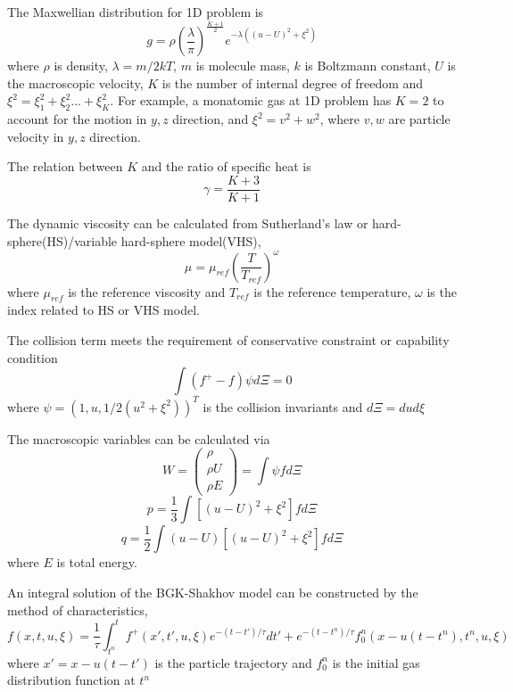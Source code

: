 \documentclass[a4paper]{book}
\begin{document}
The Maxwellian distribution for 1D problem is
\begin{equation}
    \label{eq:maxwell_1D}
    g = \rho\left(\frac{\lambda}{\pi}\right)^{\frac{K+1}{2}}e^{-\lambda((u-U)^2+\xi^2)}
\end{equation}
where $\rho$ is density, $\lambda=m/2kT$, $m$ is molecule mass, $k$ is Boltzmann constant, $U$ is the macroscopic velocity, $K$ is the number of internal degree of freedom and $\xi^2=\xi_1^2+\xi_2^2...+\xi_K^2$. For example, a monatomic gas at 1D problem has $K=2$ to account for the motion in $y,z$ direction, and $\xi^2=v^2+w^2$, where $v,w$ are particle velocity in $y,z$ direction. 

The relation between $K$ and the ratio of specific heat is
\begin{equation} 
    \gamma = \frac{K+3}{K+1}
\end{equation}

The dynamic viscosity can be calculated from Sutherland's law or hard-sphere(HS)/variable hard-sphere model(VHS),
\begin{equation} 
    \label{eq:viscosity}
    \mu = \mu_{ref}\left(\frac{T}{T_{ref}}\right)^\omega
\end{equation} 
where $\mu_{ref}$ is the reference viscosity and $T_{ref}$ is the reference temperature, $\omega$ is the index related to HS or VHS model.

The collision term meets the requirement of conservative constraint or capability condition
\begin{equation} 
    \int (f^+-f)\psi d\Xi=0
\end{equation} 
where $\psi=(1,u,1/2(u^2+\xi^2))^T$ is the collision invariants and $d\Xi=dud\xi$

The macroscopic variables can be calculated via
\begin{equation}
W=\begin{pmatrix} \rho\\ \rho U\\ \rho E \end{pmatrix} = \int \psi fd\Xi
\end{equation}
\begin{equation}
    p=\frac{1}{3}\int [(u-U)^2+\xi^2]fd\Xi
\end{equation}
\begin{equation}
    q=\frac{1}{2}\int (u-U)[(u-U)^2+\xi^2]fd\Xi
\end{equation}
where $E$ is total energy.

An integral solution of the BGK-Shakhov model can be constructed by the method of characteristics\cite{Prendergast1993},
\begin{equation}
    \label{eq:csolution}
    f(x,t,u,\xi)=\frac{1}{\tau}\int_{t^n}^t f^+(x',t',u,\xi)e^{-(t-t')/\tau}dt'+e^{-(t-t^n)/\tau}f_0^n(x-u(t-t^n),t^n,u,\xi)
\end{equation}
where $x'=x-u(t-t')$ is the particle trajectory and $f_0^n$ is the initial gas distribution function at $t^n$
\end{document}
